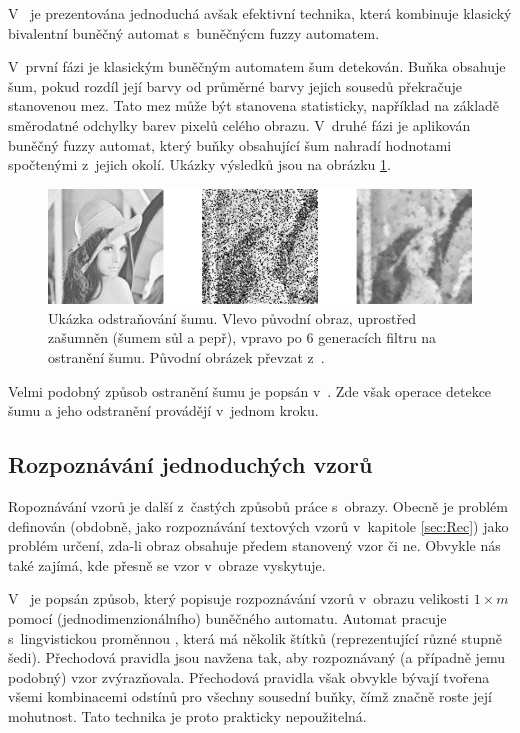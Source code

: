 V~\cite{SadRetKam-EfMetImpNoiRedImFuzCelAut} je prezentována jednoduchá avšak efektivní technika, která kombinuje klasický bivalentní buněčný automat s~buněčnýcm fuzzy automatem. 

V~první fázi je klasickým buněčným automatem šum detekován. Buňka obsahuje šum, pokud rozdíl její barvy od průměrné barvy jejich sousedů překračuje stanovenou mez. Tato mez může být stanovena statisticky, například na základě směrodatné odchylky barev pixelů celého obrazu. V~druhé fázi je aplikován buněčný fuzzy automat, který buňky obsahující šum nahradí hodnotami spočtenými z~jejich okolí. Ukázky výsledků jsou na obrázku \ref{img:Noises}. 

\begin{figure}

  \includegraphics[width=\textwidth]{genimg-noises}
    
  \caption[Ukázka odstraňování šumu]{Ukázka odstraňování šumu. Vlevo původní obraz, uprostřed zašumněn (šumem sůl a pepř), vpravo po $6$ generacích filtru na ostranění šumu. Původní obrázek převzat z~\cite{web-Lenna}.} \label{img:Noises}
\end{figure}

Velmi podobný způsob ostranění šumu je popsán v~\cite{SahUguSah-SalPepNoiFilFuzCelAut}. Zde však operace detekce šumu a jeho odstranění provádějí v~jednom kroku.

\subsection{Rozpoznávání jednoduchých vzorů} \label{subs:SimpImgRec}

Ropoznávání vzorů je další z~častých způsobů práce s~obrazy. Obecně je problém definován (obdobně, jako rozpoznávání textových vzorů v~kapitole \ref{sec:Rec}) jako problém určení, zda-li obraz obsahuje předem stanovený vzor či ne. Obvykle nás také zajímá, kde přesně se vzor v~obraze vyskytuje.

V~\cite{MajCha-FuzCelAutModPatClas} je popsán způsob, který popisuje rozpoznávání vzorů v~obrazu velikosti $1 \times m$ pomocí (jednodimenzionálního) buněčného automatu. Automat pracuje s~lingvistickou proměnnou , která má několik štítků (reprezentující různé stupně šedi). Přechodová pravidla jsou navžena tak, aby rozpoznávaný (a případně jemu podobný) vzor zvýrazňovala. Přechodová pravidla však obvykle bývají tvořena všemi kombinacemi odstínů pro všechny sousední buňky, čímž značně roste její mohutnost. Tato technika je proto prakticky nepoužitelná.

